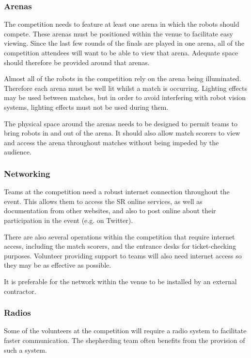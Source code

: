 \subsubsection{Arenas}

The competition needs to feature at least one arena in which the robots should compete.  These arenas must be positioned within the venue to facilitate easy viewing.  Since the last few rounds of the finals are played in one arena, all of the competition attendees will want to be able to view that arena.  Adequate space should therefore be provided around that arenas.

Almost all of the robots in the competition rely on the arena being illuminated.  Therefore each arena must be well lit whilst a match is occurring.  Lighting effects may be used between matches, but in order to avoid interfering with robot vision systems, lighting effects must not be used during them.

The physical space around the arenas needs to be designed to permit teams to bring robots in and out of the arena.  It should also allow match scorers to view and access the arena throughout matches without being impeded by the audience.

\subsubsection{Networking}

Teams at the competition need a robust internet connection throughout the event.  This allows them to access the SR online services, as well as documentation from other websites, and also to post online about their participation in the event (e.g. on Twitter).

There are also several operations within the competition that require internet access, including the match scorers, and the entrance desks for ticket-checking purposes.  Volunteer providing support to teams will also need internet access so they may be as effective as possible.

It is preferable for the network within the venue to be installed by an external contractor.

\subsubsection{Radios}

Some of the volunteers at the competition will require a radio system to facilitate faster communication.  The shepherding team often benefits from the provision of such a system.

